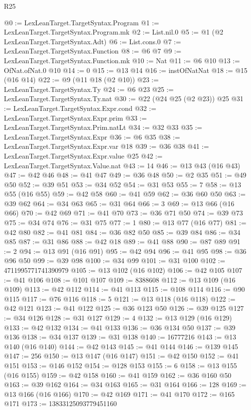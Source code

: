 \begin{lexlean}{R25}
\begin{coremodule}
@0 := LexLeanTarget.TargetSyntax.Program
@1 := LexLeanTarget.TargetSyntax.Program.mk
@2 := List.nil.{0}
@5 := @1 (@2 LexLeanTarget.TargetSyntax.Adt)
@6 := List.cons.{0}
@7 := LexLeanTarget.TargetSyntax.Function
@8 := @6 @7
@9 := LexLeanTarget.TargetSyntax.Function.mk
@10 := Nat
@11 := @6 @10
@13 := OfNat.ofNat.{0} @10
@14 := 0
@15 := @13 @14
@16 := instOfNatNat
@18 := @15 (@16 @14)
@22 := @9 (@11 @18 (@2 @10))
@23 := LexLeanTarget.TargetSyntax.Ty
@24 := @6 @23
@25 := LexLeanTarget.TargetSyntax.Ty.nat
@30 := @22 (@24 @25 (@2 @23)) @25
@31 := LexLeanTarget.TargetSyntax.Expr.cond
@32 := LexLeanTarget.TargetSyntax.Expr.prim
@33 := LexLeanTarget.TargetSyntax.Prim.natLt
@34 := @32 @33
@35 := LexLeanTarget.TargetSyntax.Expr
@36 := @6 @35
@38 := LexLeanTarget.TargetSyntax.Expr.var @18
@39 := @36 @38
@41 := LexLeanTarget.TargetSyntax.Expr.value @25
@42 := LexLeanTarget.TargetSyntax.Value.nat
@43 := 14
@46 := @13 @43 (@16 @43)
@47 := @42 @46
@48 := @41 @47
@49 := @36 @48
@50 := @2 @35
@51 := @49 @50
@52 := @39 @51
@53 := @34 @52
@54 := @31 @53
@55 := 7
@58 := @13 @55 (@16 @55)
@59 := @42 @58
@60 := @41 @59
@62 := @36 @60 @50
@63 := @39 @62
@64 := @34 @63
@65 := @31 @64
@66 := 3
@69 := @13 @66 (@16 @66)
@70 := @42 @69
@71 := @41 @70
@73 := @36 @71 @50
@74 := @39 @73
@75 := @34 @74
@76 := @31 @75
@77 := 1
@80 := @13 @77 (@16 @77)
@81 := @42 @80
@82 := @41 @81
@84 := @36 @82 @50
@85 := @39 @84
@86 := @34 @85
@87 := @31 @86
@88 := @42 @18
@89 := @41 @88
@90 := @87 @89
@91 := 2
@94 := @13 @91 (@16 @91)
@95 := @42 @94
@96 := @41 @95
@98 := @36 @96 @50
@99 := @39 @98
@100 := @34 @99
@101 := @31 @100
@102 := 4711995771741390979
@105 := @13 @102 (@16 @102)
@106 := @42 @105
@107 := @41 @106
@108 := @101 @107
@109 := 8388608
@112 := @13 @109 (@16 @109)
@113 := @42 @112
@114 := @41 @113
@115 := @108 @114
@116 := @90 @115
@117 := @76 @116
@118 := 5
@121 := @13 @118 (@16 @118)
@122 := @42 @121
@123 := @41 @122
@125 := @36 @123 @50
@126 := @39 @125
@127 := @34 @126
@128 := @31 @127
@129 := 4
@132 := @13 @129 (@16 @129)
@133 := @42 @132
@134 := @41 @133
@136 := @36 @134 @50
@137 := @39 @136
@138 := @34 @137
@139 := @31 @138
@140 := 16777216
@143 := @13 @140 (@16 @140)
@144 := @42 @143
@145 := @41 @144
@146 := @139 @145
@147 := 256
@150 := @13 @147 (@16 @147)
@151 := @42 @150
@152 := @41 @151
@153 := @146 @152
@154 := @128 @153
@155 := 6
@158 := @13 @155 (@16 @155)
@159 := @42 @158
@160 := @41 @159
@162 := @36 @160 @50
@163 := @39 @162
@164 := @34 @163
@165 := @31 @164
@166 := 128
@169 := @13 @166 (@16 @166)
@170 := @42 @169
@171 := @41 @170
@172 := @165 @171
@173 := 13833125093779451160

\end{coremodule}
\end{lexlean}
